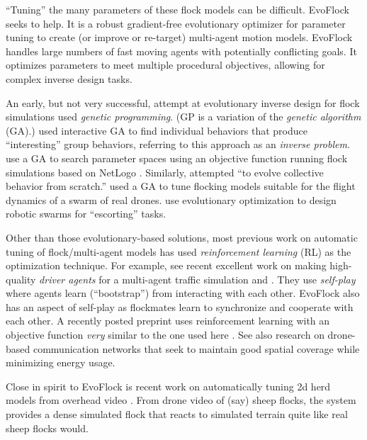 \documentclass[letterpaper]{article}
\begin{document}
``Tuning'' the many parameters of these flock models can be difficult. EvoFlock seeks to help. It is a robust gradient-free evolutionary optimizer for parameter tuning to create (or improve or re-target) multi-agent motion models. EvoFlock handles large numbers of fast moving agents with potentially conflicting goals. It optimizes parameters to meet multiple procedural objectives, allowing for complex inverse design tasks. 

An early, but not very successful, attempt at evolutionary inverse design for flock simulations \citep{reynolds_evolved_1993} used \textit{genetic programming}. (GP is a variation of the \textit{genetic algorithm} (GA).) \citet{funes_shaping_2004} used interactive GA to find individual behaviors that produce ``interesting'' group behaviors, referring to this approach as an \textit{inverse problem}. \citet{stonedahl_finding_2011} use a GA to search parameter spaces using an objective function running flock simulations based on NetLogo \citep{tisue_netlogo_2004}. Similarly, \citet{demsar_evolution_2017} attempted ``to evolve collective behavior from scratch.'' \citet{vasarhelyi_optimized_2018} used a GA to tune flocking models suitable for the flight dynamics of a swarm of real drones. \citet{stolfi_escorting_2025} use evolutionary optimization to design robotic swarms for ``escorting'' tasks.

Other than those evolutionary-based solutions, most previous work on automatic tuning of flock/multi-agent models has used \textit{reinforcement learning} (RL) \citep{sutton_reinforcement_1998} as the optimization technique. For example, see recent excellent work on making high-quality \textit{driver agents} for a multi-agent traffic simulation \citep{cornelisse_building_2025} and \citep{cusumano-towner_robust_2025}. They use \textit{self-play} where agents learn (``bootstrap'') from interacting with each other. EvoFlock also has an aspect of self-play as flockmates learn to synchronize and cooperate with each other. A recently posted preprint uses reinforcement learning with an objective function \textit{very} similar to the one used here \citep{brambati_learning_2025}. See also research on drone-based communication networks \citet{sun_integrated_2025} that seek to maintain good spatial coverage while minimizing energy usage.

Close in spirit to EvoFlock is recent work on automatically tuning 2d herd models from overhead video \citep{gong_herds_2025}. From drone video of (say) sheep flocks, the system provides a dense simulated flock that reacts to simulated terrain quite like real sheep flocks would.
\end{document}
